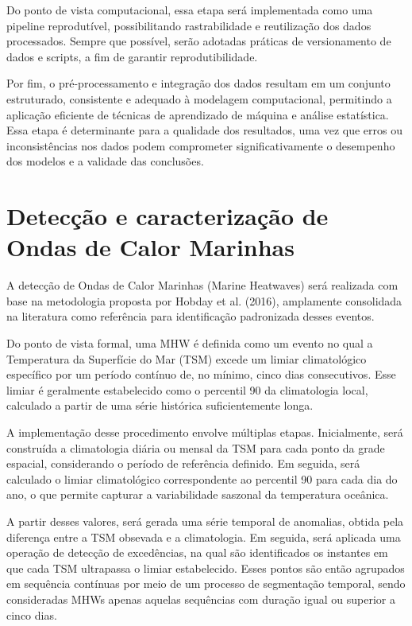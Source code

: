 	Do ponto de vista computacional, essa etapa será implementada como uma pipeline reprodutível, possibilitando rastrabilidade e reutilização dos dados processados.
	Sempre que possível, serão adotadas práticas de versionamento de dados e scripts, a fim de garantir reprodutibilidade.

	Por fim, o pré-processamento e integração dos dados resultam em um conjunto estruturado, consistente e adequado à modelagem computacional, permitindo a aplicação eficiente de técnicas de aprendizado de máquina e análise estatística.
	Essa etapa é determinante para a qualidade dos resultados, uma vez que erros ou inconsistências nos dados podem comprometer significativamente o desempenho dos modelos e a validade das conclusões.


\section{Detecção e caracterização de Ondas de Calor Marinhas}\label{sec:detecao-ondas-calor}

	A detecção de Ondas de Calor Marinhas (Marine Heatwaves) será realizada com base na metodologia proposta por Hobday et al. (2016), amplamente consolidada na literatura como referência para identificação padronizada desses eventos.
	
	Do ponto de vista formal, uma MHW é definida como um evento no qual a Temperatura da Superfície do Mar (TSM) excede um limiar climatológico específico por um período contínuo de, no mínimo, cinco dias consecutivos.
	Esse limiar é geralmente estabelecido como o percentil 90 da climatologia local, calculado a partir de uma série histórica suficientemente longa.

	A implementação desse procedimento envolve múltiplas etapas.
	Inicialmente, será construída a climatologia diária ou mensal da TSM para cada ponto da grade espacial, considerando o período de referência definido.
	Em seguida, será calculado o limiar climatológico correspondente ao percentil 90 para cada dia do ano, o que permite capturar a variabilidade saszonal da temperatura oceânica.

	A partir desses valores, será gerada uma série temporal de anomalias, obtida pela diferença entre a TSM obsevada e a climatologia.
	Em seguida, será aplicada uma operação de detecção de excedências, na qual são identificados os instantes em que cada TSM ultrapassa o limiar estabelecido.
	Esses pontos são então agrupados em sequência contínuas por meio de um processo de segmentação temporal, sendo consideradas MHWs apenas aquelas sequências com duração igual ou superior a cinco dias.

